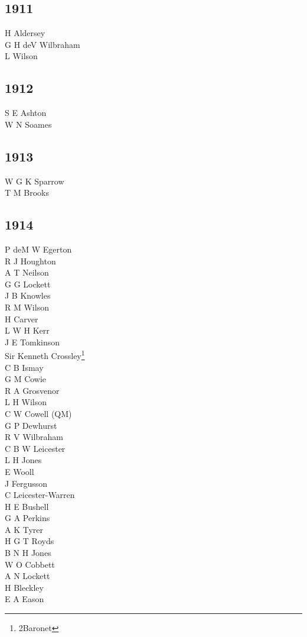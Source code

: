\begin{multicols}{3}
  \subsection*{1911}
  H Aldersey \\
  G H deV Wilbraham \\
  L Wilson \\
  \subsection*{1912}
  S E Ashton \\
  W N Soames \\
  \subsection*{1913}
  W G K Sparrow \\
  T M Brooks \\
  \subsection*{1914}
  P deM W Egerton \\
  R J Houghton \\
  A T Neilson \\
  G G Lockett \\
  J B Knowles \\
  R M Wilson \\
  H Carver \\
  L W H Kerr \\
  J E Tomkinson \\
  Sir Kenneth Crossley\footnote{2\nd Baronet} \\
  C B Ismay \\
  G M Cowie \\
  R A Grosvenor \\
  L H Wilson \\
  C W Cowell (QM) \\
  G P Dewhurst \\
  R V Wilbraham \\
  C B W Leicester \\
  L H Jones \\
  E Wooll \\
  J Fergusson \\
  C Leicester-Warren \\
  H E Bushell \\
  G A Perkins \\
  A K Tyrer \\
  H G T Royds \\
  B N H Jones \\
  W O Cobbett \\
  A N Lockett \\
  H Bleckley \\
  E A Eason \\

\end{multicols}
